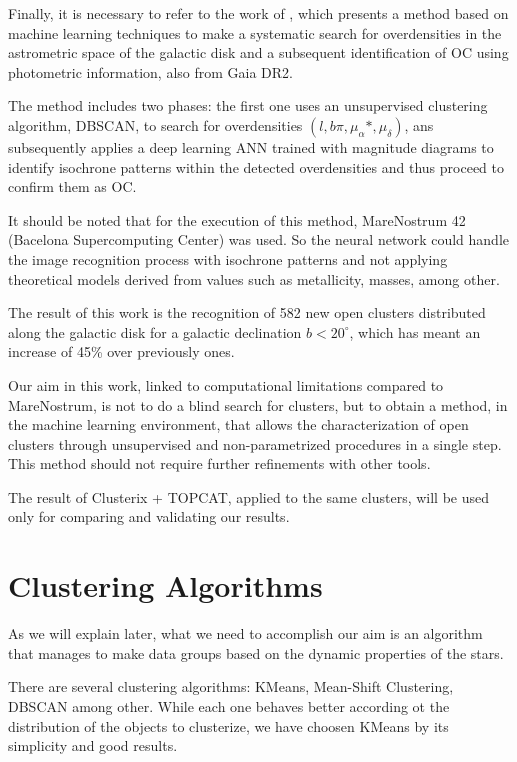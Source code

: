 \documentclass[11pt, a4paper, english]{book}
\begin{document}
Finally, it is necessary to refer to the work of \cite{castro2020hunting}, which presents a method based on machine learning techniques to make
a systematic search for overdensities in the astrometric space of the galactic disk and a subsequent identification of OC using photometric
information, also from Gaia DR2.

The method includes two phases: the first one uses an unsupervised clustering algorithm, DBSCAN, to search for overdensities
$(l, b \pi, \mu_{\alpha} *, \mu_{\delta})$, ans subsequently applies a deep learning ANN trained with magnitude diagrams to identify isochrone
patterns within the detected overdensities and thus proceed to confirm them as OC.

It should be noted that for the execution of this method, MareNostrum 42 (Bacelona Supercomputing Center) was used. So the neural network could handle
the image recognition process with isochrone patterns and not applying theoretical models derived from values such as metallicity, masses, among other.

The result of this work is the recognition of 582 new open clusters distributed along the galactic disk for a galactic declination $b < 20^{\circ}$,
which has meant an increase of 45\% over previously ones.

Our aim in this work, linked to computational limitations compared to MareNostrum, is not to do a blind search for clusters, but to obtain a method,
in the machine learning environment, that allows the characterization of open clusters through unsupervised and non-parametrized procedures in a
single step. This method should not require further refinements with other tools.

The result of Clusterix + TOPCAT, applied to the same clusters, will be used only for comparing and validating our results.

\section{Clustering Algorithms}

As we will explain later, what we need to accomplish our aim is an algorithm that manages to make data groups based on the dynamic properties of the stars.

There are several clustering algorithms: KMeans, Mean-Shift Clustering, DBSCAN \cite{ester1996density} among other.
While each one behaves better according ot the distribution of the objects to clusterize, we have choosen KMeans by its simplicity and good results.
\end{document}
